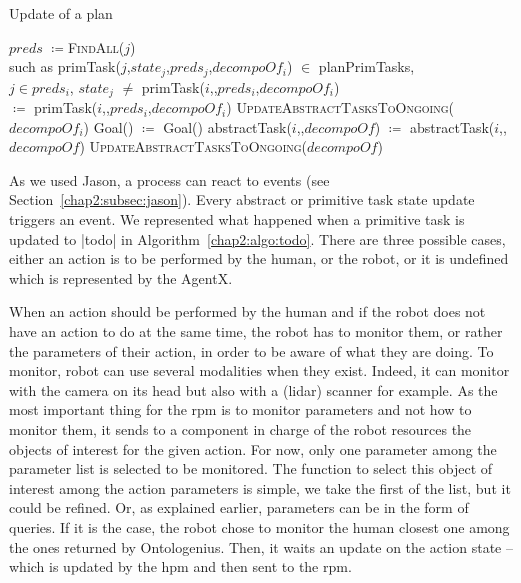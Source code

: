 \documentclass[a4paper,11pt,twoside]{StyleThese}
\begin{document}
\begin{algorithm}[!htb]
	\caption{Update of a plan}
	\label{chap2:algo:UP}
	\begin{algorithmic}
		\State $preds$ $\coloneqq$\textsc{FindAll}($j$) 
		\\\hfill such as primTask($j$,$state_j$,$preds_j$,$decompoOf_i$) $\in$ planPrimTasks,\\ \hfill $j \in preds_i$, $state_j$ $\neq$ 
		\State primTask($i$,,$preds_i$,$decompoOf_i$) 
		\\\hfill $\coloneqq$ primTask($i$,,$preds_i$,$decompoOf_i$)
		\State \textsc{UpdateAbstractTasksToOngoing($decompoOf_i$)}
		\EndIf
		\EndFor
		\State Goal() $\coloneqq$ Goal()
		\EndIf
		\EndFunction
		\Statex
		\State abstractTask($i$,,$decompoOf$) $\coloneqq$ abstractTask($i$,,$decompoOf$)
		\State \textsc{UpdateAbstractTasksToOngoing($decompoOf$)}
		\EndIf
		\EndFunction
	\end{algorithmic}
\end{algorithm}

As we used Jason, a process can react to events (see Section~\ref{chap2:subsec:jason}). Every abstract or primitive task state update triggers an event. We represented what happened when a primitive task is updated to |todo| in Algorithm~\ref{chap2:algo:todo}. There are three possible cases, either an action is to be performed by the human, or the robot, or it is undefined which is represented by the AgentX. 

When an action should be performed by the human and if the robot does not have an action to do at the same time, the robot has to monitor them, or rather the parameters of their action, in order to be aware of what they are doing. To monitor, robot can use several modalities when they exist. Indeed, it can monitor with the camera on its head but also with a (lidar) scanner for example. As the most important thing for the \acrshort{rpm} is to monitor parameters and not how to monitor them, it sends to a component in charge of the robot resources the objects of interest for the given action. For now, only one parameter among the parameter list is selected to be monitored. The function to select this object of interest among the action parameters is simple, we take the first of the list, but it could be refined. Or, as explained earlier, parameters can be in the form of \sparql{} queries. If it is the case, the robot chose to monitor the human closest one among the ones returned by Ontologenius. Then, it waits an update on the action state -- which is updated by the \acrfull{hpm} and then sent to the \acrshort{rpm}.
\end{document}
